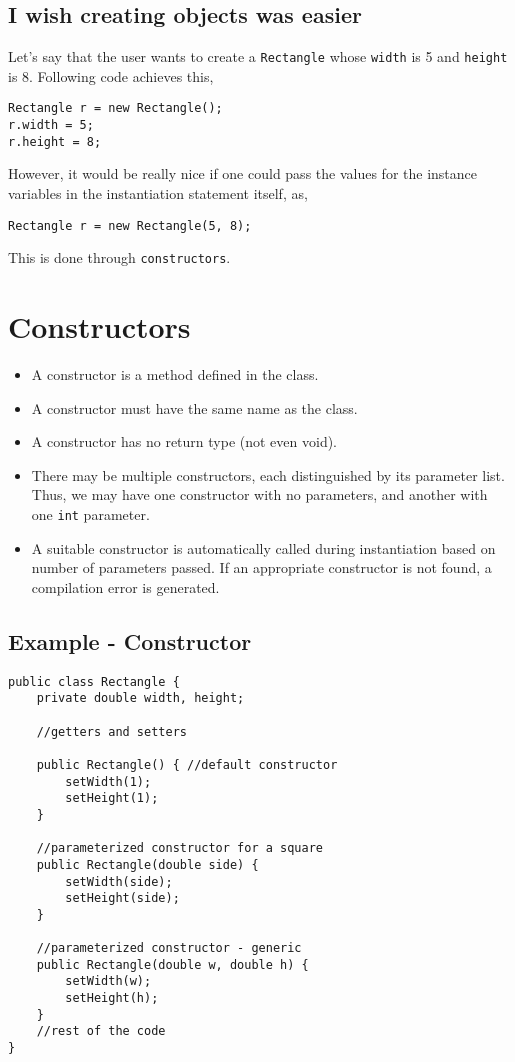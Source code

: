 \documentclass[abstracton]{scrartcl}
\begin{document}
\subsection{I wish creating objects was easier}

Let's say that the user wants to create a \texttt{Rectangle} whose \texttt{width} is 5 and \texttt{height} is 8. Following code achieves this,

\begin{lstlisting}
Rectangle r = new Rectangle();
r.width = 5;
r.height = 8;
\end{lstlisting}

However, it would be really nice if one could pass the values for the instance variables in the instantiation statement itself, as,

\begin{lstlisting}
Rectangle r = new Rectangle(5, 8);
\end{lstlisting}

This is done through \texttt{constructors}.

\section{Constructors}
\begin{itemize}
\item A constructor is a method defined in the class.
\item A constructor must have the same name as the class.
\item A constructor has no return type (not even void).
\item There may be multiple constructors, each distinguished by its parameter list. Thus, we may have one constructor with no parameters, and another with one \texttt{int} parameter.
\item A suitable constructor is automatically called during instantiation based on number of parameters passed. If an appropriate constructor is not found, a compilation error is generated.
\end{itemize}

\subsection{Example - Constructor}

\begin{lstlisting}[basicstyle=\tiny]
public class Rectangle {
    private double width, height;
    
    //getters and setters

    public Rectangle() { //default constructor
		setWidth(1);
		setHeight(1);
    }

    //parameterized constructor for a square
    public Rectangle(double side) { 
		setWidth(side);
		setHeight(side);
    }

    //parameterized constructor - generic
    public Rectangle(double w, double h) { 
		setWidth(w);
		setHeight(h);
    }
    //rest of the code
}
\end{lstlisting}
\end{document}
